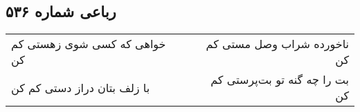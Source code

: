 \begin{center}
\section*{رباعی شماره ۵۳۶}
\label{sec:sh536}
\begin{longtable}{l p{0.5cm} r}
خواهی که کسی شوی زهستی کم کن
&&
ناخورده شراب وصل مستی کم کن
\\
با زلف بتان دراز دستی کم کن
&&
بت را چه گنه تو بت‌پرستی کم کن
\\
\end{longtable}
\end{center}
